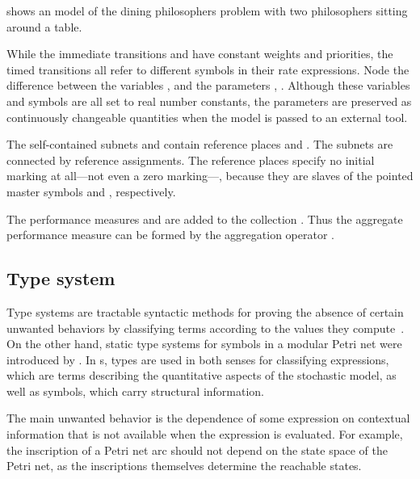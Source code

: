 \begin{runningExample}
  \label{ex:rgspn:example}
   shows an  model of the dining philosophers problem with two philosophers sitting around a table.

  While the immediate transitions  and  have constant weights and priorities, the timed transitions all refer to different symbols in their rate expressions. Node the difference between the variables ,  and the parameters , . Although these variables and symbols are all set to real number constants, the parameters are preserved as continuously changeable quantities when the model is passed to an external tool.

  The self-contained subnets  and  contain reference places  and . The subnets are connected by reference assignments. The reference places specify no initial marking at all---not even a zero marking---, because they are slaves of the pointed master symbols  and , respectively.

  The performance measures  and  are added to the collection . Thus the aggregate performance measure  can be formed by the aggregation operator .
\end{runningExample}

\subsection{Type system}
\label{ssec:rgspn:typesystem}

Type systems are tractable syntactic methods for proving the absence of certain unwanted behaviors by classifying terms according to the values they compute~\citep[Chapter~1]{Pierce02tapl}. On the other hand, static type systems for symbols in a modular Petri net were introduced by \citet{Kindler07modular}. In s, types are used in both senses for classifying expressions, which are terms describing the quantitative aspects of the stochastic model, as well as symbols, which carry structural information.

The main unwanted behavior is the dependence of some expression on contextual information that is not available when the expression is evaluated. For example, the inscription of a Petri net arc should not depend on the state space of the Petri net, as the inscriptions themselves determine the reachable states.

